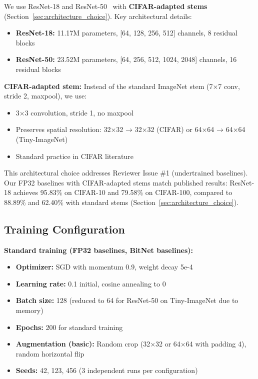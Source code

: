 We use ResNet-18 and ResNet-50~\cite{he2016resnet} with \textbf{CIFAR-adapted stems} (Section~\ref{sec:architecture_choice}). Key architectural details:

\begin{itemize}
    \item \textbf{ResNet-18:} 11.17M parameters, [64, 128, 256, 512] channels, 8 residual blocks
    \item \textbf{ResNet-50:} 23.52M parameters, [64, 256, 512, 1024, 2048] channels, 16 residual blocks
\end{itemize}

\textbf{CIFAR-adapted stem:} Instead of the standard ImageNet stem (7×7 conv, stride 2, maxpool), we use:
\begin{itemize}
    \item 3×3 convolution, stride 1, no maxpool
    \item Preserves spatial resolution: 32×32 → 32×32 (CIFAR) or 64×64 → 64×64 (Tiny-ImageNet)
    \item Standard practice in CIFAR literature~\cite{pytorch_cifar_kuangliu, pytorch_cifar100_weiaicunzai}
\end{itemize}

This architectural choice addresses Reviewer Issue \#1 (undertrained baselines). Our FP32 baselines with CIFAR-adapted stems match published results: ResNet-18 achieves 95.83\% on CIFAR-10 and 79.58\% on CIFAR-100, compared to 88.89\% and 62.40\% with standard stems (Section~\ref{sec:architecture_choice}).

\subsection{Training Configuration}
\label{sec:methods:training}

\textbf{Standard training (FP32 baselines, BitNet baselines):}
\begin{itemize}
    \item \textbf{Optimizer:} SGD with momentum 0.9, weight decay 5e-4
    \item \textbf{Learning rate:} 0.1 initial, cosine annealing to 0
    \item \textbf{Batch size:} 128 (reduced to 64 for ResNet-50 on Tiny-ImageNet due to memory)
    \item \textbf{Epochs:} 200 for standard training
    \item \textbf{Augmentation (basic):} Random crop (32×32 or 64×64 with padding 4), random horizontal flip
    \item \textbf{Seeds:} 42, 123, 456 (3 independent runs per configuration)
\end{itemize}

